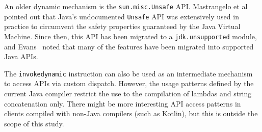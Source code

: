 An older dynamic mechanism is the \texttt{sun.misc.Unsafe} API. Mastrangelo et al~\cite{mastrangelo15:_use_your_own_risk} pointed out that Java's undocumented 
\texttt{Unsafe} API was extensively used in practice to circumvent the safety properties guaranteed by the Java Virtual Machine. Since then, this API has been migrated to a \texttt{jdk.unsupported} module, and Evans~\cite{evans20:_unsaf} noted that many of the features have been  migrated into supported Java APIs.

The \texttt{invokedynamic} instruction can also be used as an intermediate mechanism to access APIs via custom dispatch. However, the usage patterns defined by the current Java compiler restrict the use to the compilation of lambdas and string concatenation only.  There might be more interesting API access patterns in clients compiled with non-Java compilers (such as Kotlin), but this is outside the scope of this study. 








